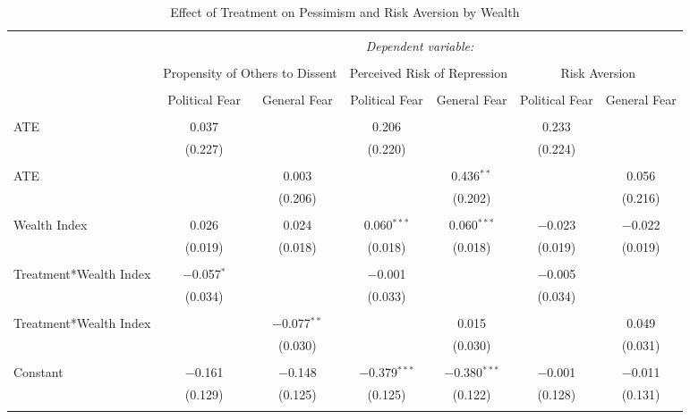 \documentclass{article}
\begin{document}
\begin{landscape}
\setlength{\tabcolsep}{0.3pt}
\begin{table}[!htbp] \centering 
  \caption{Effect of Treatment on Pessimism and Risk Aversion by Wealth} 
  \label{} 
\begin{tabular}{@{\extracolsep{5pt}}lcccccc} 
\\[-1.8ex]\hline 
\hline \\[-1.8ex] 
 & \multicolumn{6}{c}{\textit{Dependent variable:}} \\ 
\cline{2-7} 
\\[-1.8ex] & \multicolumn{2}{c}{Propensity of Others to Dissent} & \multicolumn{2}{c}{Perceived Risk of Repression} & \multicolumn{2}{c}{Risk Aversion} \\ 
\\[-1.8ex] & Political Fear & General Fear & Political Fear & General Fear & Political Fear & General Fear \\
\hline \\[-1.8ex] 
 ATE & 0.037 &  & 0.206 &  & 0.233 &  \\ 
  & (0.227) &  & (0.220) &  & (0.224) &  \\ 
  & & & & & & \\ 
 ATE &  & 0.003 &  & 0.436$^{**}$ &  & 0.056 \\ 
  &  & (0.206) &  & (0.202) &  & (0.216) \\ 
  & & & & & & \\ 
 Wealth Index & 0.026 & 0.024 & 0.060$^{***}$ & 0.060$^{***}$ & $-$0.023 & $-$0.022 \\ 
  & (0.019) & (0.018) & (0.018) & (0.018) & (0.019) & (0.019) \\ 
  & & & & & & \\ 
 Treatment*Wealth Index & $-$0.057$^{*}$ &  & $-$0.001 &  & $-$0.005 &  \\ 
  & (0.034) &  & (0.033) &  & (0.034) &  \\ 
  & & & & & & \\ 
 Treatment*Wealth Index &  & $-$0.077$^{**}$ &  & 0.015 &  & 0.049 \\ 
  &  & (0.030) &  & (0.030) &  & (0.031) \\ 
  & & & & & & \\ 
 Constant & $-$0.161 & $-$0.148 & $-$0.379$^{***}$ & $-$0.380$^{***}$ & $-$0.001 & $-$0.011 \\ 
  & (0.129) & (0.125) & (0.125) & (0.122) & (0.128) & (0.131) \\ 
  & & & & & & \\ 

\end{tabular}
\end{table}
\end{landscape}
\end{document}
